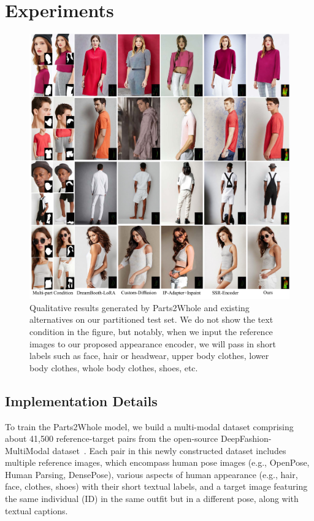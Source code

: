 \section{Experiments}

\begin{figure}
    \centering
    \includegraphics[width=\textwidth]{figure/comparison.pdf}
    \caption{Qualitative results generated by Parts2Whole and existing alternatives on our partitioned test set. We do not show the text condition in the figure, but notably, when we input the reference images to our proposed appearance encoder, we will pass in short labels such as face, hair or headwear, upper body clothes, lower body clothes, whole body clothes, shoes, etc.}
    \label{fig:comparison}
\end{figure}

\subsection{Implementation Details}

To train the Parts2Whole model, we build a multi-modal dataset comprising about 41,500 reference-target pairs from the open-source DeepFashion-MultiModal dataset~\cite{jiang2022text2human,liuLQWTcvpr16DeepFashion}. 
Each pair in this newly constructed dataset includes multiple reference images, which encompass human pose images (e.g., OpenPose, Human Parsing, DensePose), various aspects of human appearance (e.g., hair, face, clothes, shoes) with their short textual labels, and a target image featuring the same individual (ID) in the same outfit but in a different pose, along with textual captions.

